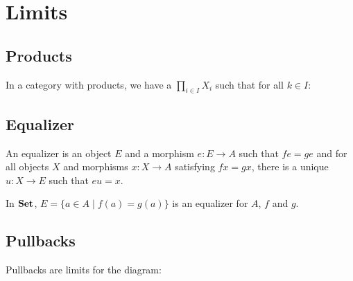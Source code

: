 \chapter{Limits}

\section{Products}

In a category with products, we have a $\prod_{i \in I} X_i$ such that for
all $k \in I$:

\begin{center}
\end{center}

\section{Equalizer}

An equalizer is an object $E$ and a morphism $e: E \to A$ such that $fe=ge$ and
for all objects $X$ and morphisms $x: X \to A$ satisfying $fx=gx$, there is a
unique $u: X \to E$ such that $eu = x$.

\begin{center}
\end{center}

\begin{example}

In $\mathbf {Set}$, $E = \Big\{ a \in A \mid f(a) = g(a)\Big\}$ is an equalizer
for $A$, $f$ and $g$.

\end{example}

\section{Pullbacks}

Pullbacks are limits for the diagram:

